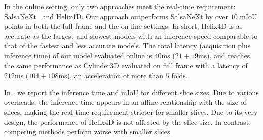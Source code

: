 \documentclass[runningheads]{tpls/llncs}
\begin{document}
In the online setting, only two approaches meet the real-time requirement: SalsaNeXt~\cite{cortinhal2020salsanext} and Helix4D. Our approach outperforms SalsaNeXt by over $10$ mIoU points in both the full frame and the on-line settings. In short, Helix4D is as accurate as the largest and slowest models with an inference speed comparable to that of the fastest and less accurate models. The total latency (acquisition plus inference time) of our model evaluated online is $40$ms ($21+19$ms), and reaches the same performance as Cylinder3D evaluated on full frame with a latency of $212$ms ($104+108$ms), an acceleration of more than $5$ folds.

In , we report the inference time and mIoU for different slice sizes. Due to various overheads, the inference time appears in an affine relationship with the size of slices, making the real-time requirement stricter for smaller slices. Due to its very design, the performance of Helix4D is not affected by the slice size. In contrast, competing methods perform worse with smaller slices.
\end{document}
